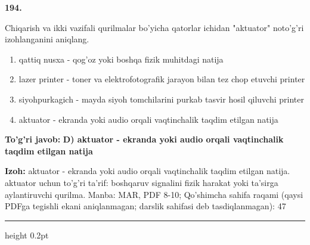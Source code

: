 \documentclass[10pt,a4paper]{article}
\begin{document}
{\bfseries\sffamily\color{ink} 194.}
\par
Chiqarish va ikki vazifali qurilmalar bo'yicha qatorlar ichidan "aktuator" noto'g'ri izohlanganini aniqlang.
\begin{enumerate}[label=\Alph*),leftmargin=9mm]
\item qattiq nusxa - qog'oz yoki boshqa fizik muhitdagi natija
\item lazer printer - toner va elektrofotografik jarayon bilan tez chop etuvchi printer
\item siyohpurkagich - mayda siyoh tomchilarini purkab tasvir hosil qiluvchi printer
\item aktuator - ekranda yoki audio orqali vaqtinchalik taqdim etilgan natija
\end{enumerate}
\begin{tcolorbox}[enhanced,breakable,colback=teal!4,colframe=teal!60!black,boxrule=0.45pt,arc=1.2mm,left=2.7mm,right=2.7mm,top=1.8mm,bottom=1.8mm,before skip=2mm,after skip=2mm]
{\bfseries\sffamily\color{teal}To'g'ri javob:} \textbf{D) aktuator - ekranda yoki audio orqali vaqtinchalik taqdim etilgan natija}
\par\smallskip
{\bfseries Izoh:} aktuator - ekranda yoki audio orqali vaqtinchalik taqdim etilgan natija. aktuator uchun to'g'ri ta'rif: boshqaruv signalini fizik harakat yoki ta'sirga aylantiruvchi qurilma. Manba: MAR, PDF 8-10; Qo'shimcha sahifa raqami (qaysi PDFga tegishli ekani aniqlanmagan; darslik sahifasi deb tasdiqlanmagan): 47
\end{tcolorbox}
\vspace{2mm}\hrule height 0.2pt\vspace{3mm}
\end{document}
